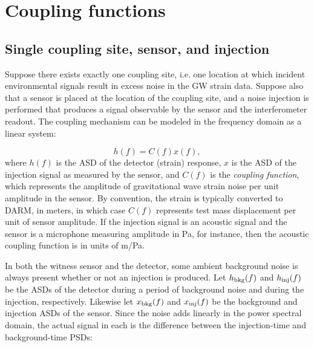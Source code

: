 


\section{Coupling functions}\label{sec:cf}

\subsection{Single coupling site, sensor, and injection}

Suppose there exists exactly one coupling site, i.e. one location at which incident environmental signals result in excess noise in the \ac{GW} strain data.
Suppose also that a sensor is placed at the location of the coupling site, and a noise injection is performed that produces a signal observable by the sensor and the interferometer readout.
The coupling mechanism can be modeled in the frequency domain as a linear system:

\begin{equation}\label{eq:cf_model}
	h(f) = C(f) x(f),
\end{equation}
where $h(f)$ is the \ac{ASD} of the detector (strain) response, $x$ is the \ac{ASD} of the injection signal as measured by the sensor, and $C(f)$ is the \textit{coupling function}, which represents the amplitude of gravitational wave strain noise per unit amplitude in the sensor.
By convention, the strain is typically converted to \ac{DARM}, in meters, in which case $C(f)$ represents  test mass displacement per unit of sensor amplitude.
If the injection signal is an acoustic signal and the sensor is a microphone measuring amplitude in Pa, for instance, then the acoustic coupling function is in units of m/Pa.

In both the witness sensor and the detector, some ambient background noise is always present whether or not an injection is produced. Let $h_{\textrm{bkg}}(f)$ and $h_{\textrm{inj}}(f)$ be the \acp{ASD} of the detector during a period of background noise and during the injection, respectively. Likewise let $x_{\textrm{bkg}}(f)$ and $x_{\textrm{inj}}(f)$ be the background and injection \acp{ASD} of the sensor. Since the noise adds linearly in the power spectral domain, the actual signal in each is the difference between the injection-time and background-time \acp{PSD}:

